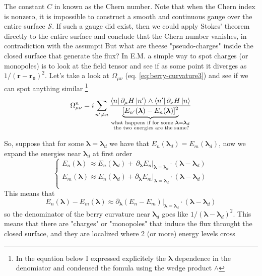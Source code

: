     The constant $C$ in known as the Chern number. Note that when the Chern index is nonzero, it is impossible to construct a smooth and continuous gauge over the entire surface $\mathcal{S}$. If such a gauge did exist, then we could apply Stokes’ theorem directly to the entire surface and conclude that the Chern number vanishes, in contradiction with the assumpti\newline
    But what are theese "pseudo-charges" inside the closed surface that generate the flux?\newline
    In E.M. a simple way to spot charges (or monopoles) is to look at the field tensor and see if as some point it diverges as $1/(\mathbf r-\mathbf{r_0})^2$. Let's take a look at $\Omega_{\mu\nu}$ (eq. \ref{eq:berry-curvature3}) and see if we can spot anything similar \footnote{In the equation below I expressed explicitely the $\boldsymbol \lambda$ dependence in the denomiator and condensed the fomula using the wedge product $\wedge$}
    \begin{equation}
        \label{eq:monopoles1}
        \Omega_{\mu\nu}^n=i\sum_{n'\neq n} \frac{\bra{n}\partial_\mu H\ket{n'}\wedge \bra{n'} \partial_\nu H\ket{n}}
        {\underbrace{[E_{n'}(\boldsymbol \lambda)-E_n(\boldsymbol \lambda)]^2}_
        {\substack{\text{what happens if for some } \boldsymbol \lambda=\boldsymbol \lambda_d  \\\text{ the two energies are the same?}}}}
    \end{equation}

    So, suppose that for some $\boldsymbol \lambda=\boldsymbol \lambda_d$ we have that $E_n (\boldsymbol \lambda_d)=E_m(\boldsymbol \lambda_d)$, now we expand the energies near $\boldsymbol \lambda_d$ at first order
    \[
    \begin{cases}
    E_n(\boldsymbol \lambda)\, \approx E_n(\boldsymbol \lambda_d) +\, \partial_{\boldsymbol \lambda} E_n|_{\boldsymbol \lambda =\boldsymbol \lambda_d}\cdot (\boldsymbol \lambda-\boldsymbol \lambda_d)\\
    E_m(\boldsymbol \lambda)\approx E_n(\boldsymbol \lambda_d) + \partial_{\boldsymbol \lambda} E_m|_{\boldsymbol \lambda =\boldsymbol \lambda_d}\cdot (\boldsymbol \lambda-\boldsymbol \lambda_d)\\

    \end{cases}
    \]
    This means that 
    \[
    E_n(\boldsymbol \lambda)-E_m(\boldsymbol \lambda)\approx \partial_{\boldsymbol \lambda} (E_n-E_m)|_{\boldsymbol \lambda =\boldsymbol \lambda_d}\cdot (\boldsymbol \lambda-\boldsymbol \lambda_d)
    \]
    so the denominator of the berry curvature near $\boldsymbol \lambda_d$ goes like $ 1/(\boldsymbol \lambda-\boldsymbol \lambda_d)^2$.\newline
    This means that there are "charges" or "monopoles" that induce the flux throught the closed surface, and they are localized where 2 (or more) energy levels cross
